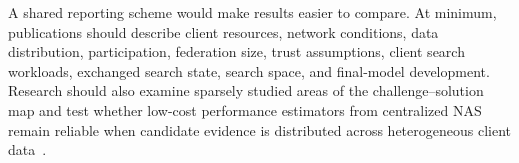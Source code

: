 A shared reporting scheme would make results easier to compare. At minimum, publications should describe client resources, network conditions, data distribution, participation, federation size, trust assumptions, client search workloads, exchanged search state, search space, and final-model development. Research should also examine sparsely studied areas of the challenge--solution map and test whether low-cost performance estimators from centralized NAS remain reliable when candidate evidence is distributed across heterogeneous client data~\cite{nas_in_fl_2026}.
